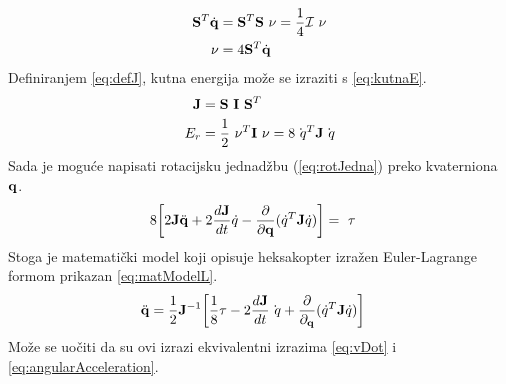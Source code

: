 \documentclass[times, utf8, diplomski]{fer}
\begin{document}
\begin{align}
{\bf S}^{T}\dot{{\bf q}}&={\bf S}^{T}{\bf S}{\ \nu}={1\over 4}{\cal I}{\ \nu} \label{eq:lijevoMnozenje} \\
{\ \nu}&=4{\bf S}^{T}\dot{{\bf q}} \label{eq:brzinaL}
\end{align}
Definiranjem \ref{eq:defJ}, kutna energija može se izraziti s \ref{eq:kutnaE}.
\begin{align}
{\bf J}&={\bf S\ I} \ {\bf S}^{T} \label{eq:defJ} \\
E_{r}&={1\over 2}{\ \nu}^{T}{\bf I}{\ \nu}=8\dot{{\ q}}^{T}{\bf J}\dot{{\ q}} \label{eq:kutnaE}
\end{align}
Sada je moguće napisati rotacijsku jednadžbu (\ref{eq:rotJedna}) preko kvaterniona $\bf q$. 
\begin{align}
8\bigg[2{\bf J}\ddot{{\bf q}}+2{d{\bf J}\over dt}\dot{q}-{\partial\over \partial {\bf q}}(\dot{q}^{T}{\bf J}\dot{q})\bigg]&={\ \tau} \label{eq:rotJedna}
\end{align}
Stoga je matematički model koji opisuje heksakopter izražen Euler-Lagrange formom prikazan \ref{eq:matModelL}.
\begin{align}
\ddot{{\bf q}}&={1\over 2}{\bf J}^{-1}\bigg[{1\over 8}{ \tau}-2{d{\bf J}\over dt}\dot{{\ q}}+{\partial\over \partial_{{\bf q}}}(\dot{q}^{T}{\bf J}\dot{q})\bigg] \label{eq:matModelL}
\end{align}
Može se uočiti da su ovi izrazi ekvivalentni izrazima \ref{eq:vDot} i \ref{eq:angularAcceleration}.
\end{document}
